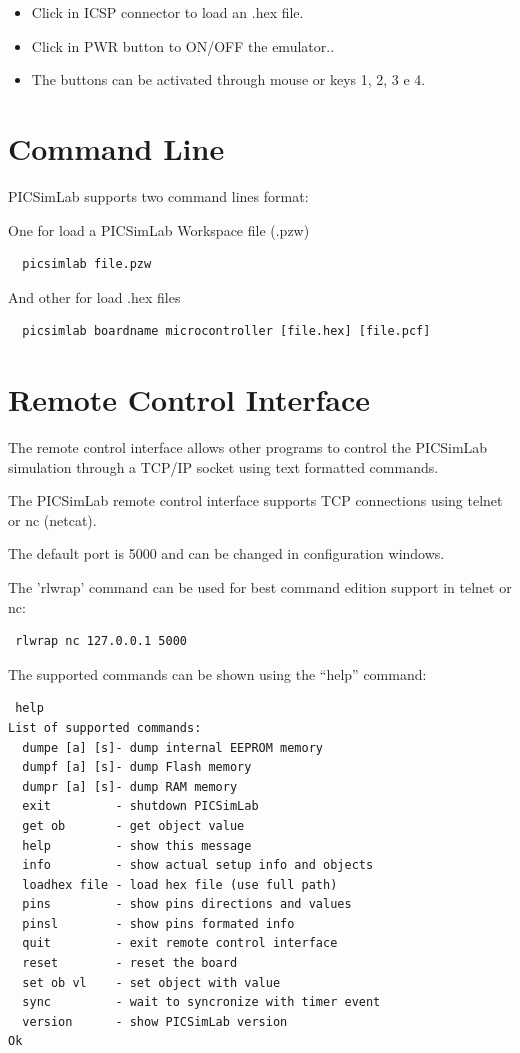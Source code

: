 \begin{itemize}
 \item Click in ICSP connector to load an .hex file.
 \item Click in PWR button to ON/OFF the emulator..
 \item The buttons can be activated through mouse or keys 1, 2, 3 e 4.
\end{itemize}


\section{Command Line}

PICSimLab supports two command lines format:

One for load a PICSimLab Workspace file (.pzw) 
\begin{verbatim}
  picsimlab file.pzw
\end{verbatim}

And other for load .hex files
\begin{verbatim}
  picsimlab boardname microcontroller [file.hex] [file.pcf]
\end{verbatim}


\section{Remote Control Interface}\hypertarget{def:rcontrol}{}

The remote control interface allows other programs to control the PICSimLab simulation
through a TCP/IP socket using text formatted commands. 

The PICSimLab remote control interface supports TCP connections using telnet or nc (netcat).

The default port is 5000 and can be changed in configuration windows. 

The 'rlwrap' command can be used for best command edition support in telnet or nc:
\begin{verbatim}
 rlwrap nc 127.0.0.1 5000
\end{verbatim}
  
The supported commands can be shown using the ``help'' command:  
\begin{verbatim}
 help
List of supported commands:
  dumpe [a] [s]- dump internal EEPROM memory
  dumpf [a] [s]- dump Flash memory
  dumpr [a] [s]- dump RAM memory
  exit         - shutdown PICSimLab
  get ob       - get object value
  help         - show this message
  info         - show actual setup info and objects
  loadhex file - load hex file (use full path)  
  pins         - show pins directions and values
  pinsl        - show pins formated info
  quit         - exit remote control interface
  reset        - reset the board
  set ob vl    - set object with value
  sync         - wait to syncronize with timer event
  version      - show PICSimLab version
Ok
\end{verbatim}
  

